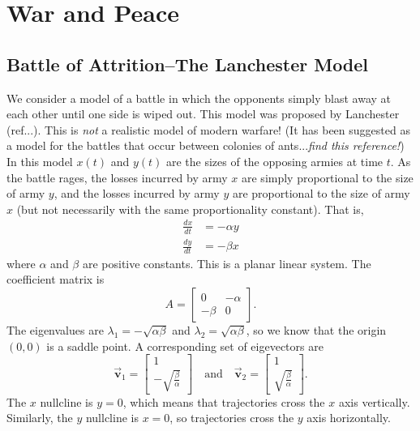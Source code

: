 \documentclass{book}
\newcommand{\BV}{\vec{\textbf{v}}}
\begin{document}
\section{War and Peace}
\subsection{Battle of Attrition--The Lanchester Model}
%
We consider a model of a battle in which the opponents
simply blast away at each other until one side is wiped
out.
This model was proposed by Lanchester (ref...).
This is \emph{not} a realistic model of modern warfare!
(It has been suggested as a model for the battles that
occur between colonies of ants...\emph{find this reference!})
In this model $x(t)$ and $y(t)$ are the sizes of the
opposing armies at time $t$.
As the battle rages, the losses incurred by army $x$
are simply proportional to the size of army $y$,
and the losses incurred by army $y$ are proportional
to the size of army $x$ (but not necessarily with
the same proportionality constant).
That is,
\begin{equation}
\begin{split}
   \frac{dx}{dt} & = - \alpha y \\
   \frac{dy}{dt} & = - \beta x
\end{split}
\end{equation}
where $\alpha$ and $\beta$ are positive constants.
This is a planar linear system.
The coefficient matrix is
\begin{equation}
  A = \begin{bmatrix} 0 & -\alpha \\ -\beta & 0 \end{bmatrix}.
\end{equation}
The eigenvalues are $\lambda_1 = -\sqrt{\alpha\beta}$
and $\lambda_2 = \sqrt{\alpha\beta}$,
so we know that the origin $(0,0)$ is a saddle point.
A corresponding set of eigevectors are
\[
  \BV_1 = \begin{bmatrix} 1 \\ -\sqrt{\frac{\beta}{\alpha}}\end{bmatrix}
  \quad \textrm{and}\quad
  \BV_2 = \begin{bmatrix} 1 \\ \sqrt{\frac{\beta}{\alpha}}\end{bmatrix}.
\]
The $x$ nullcline is $y=0$, which means that trajectories
cross the $x$ axis vertically. Similarly, the $y$ nullcline is
$x=0$, so trajectories cross the $y$ axis horizontally.
\end{document}
